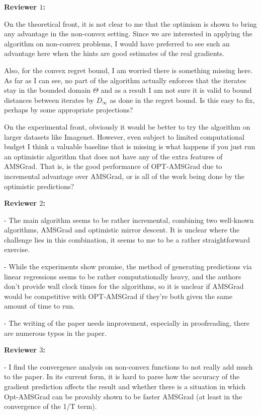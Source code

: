 \documentclass{article}
\begin{document}
\textbf{Reviewer $1$:}

On the theoretical front, it is not clear to me that the optimism is shown to bring any advantage in the non-convex setting. Since we are interested in applying the algorithm on non-convex problems, I would have preferred to see such an advantage here when the hints are good estimates of the real gradients. 

Also, for the convex regret bound, I am worried there is something missing here. As far as I can see, no part of the algorithm actually enforces that the iterates stay in the bounded domain $\Theta$ and as a result I am not sure it is valid to bound distances between iterates by $D_\infty$ as done in the regret bound. Is this easy to fix, perhaps by some appropriate projections? 

On the experimental front, obviously it would be better to try the algorithm on larger datasets like Imagenet. However, even subject to limited computational budget I think a valuable baseline that is missing is what happens if you just run an optimistic algorithm that does not have any of the extra features of AMSGrad. That is, is the good performance of OPT-AMSGrad due to incremental advantage over AMSGrad, or is all of the work being done by the optimistic predictions?


\textbf{Reviewer $2$:}

- The main algorithm seems to be rather incremental, combining two well-known algorithms, AMSGrad and optimistic mirror descent. It is unclear where the challenge lies in this combination, it seems to me to be a rather straightforward exercise. 

- While the experiments show promise, the method of generating predictions via linear regressions seems to be rather computationally heavy, and the authors don't provide wall clock times for the algorithms, so it is unclear if AMSGrad would be competitive with OPT-AMSGrad if they're both given the same amount of time to run. 

- The writing of the paper needs improvement, especially in proofreading, there are numerous typos in the paper.

\textbf{Reviewer $3$:}

- I find the convergence analysis on non-convex functions to not really add much to the paper. In its current form, it is hard to parse how the accuracy of the gradient prediction affects the result and whether there is a situation in which Opt-AMSGrad can be provably shown to be faster AMSGrad (at least in the convergence of the 1/T term).
\end{document}
